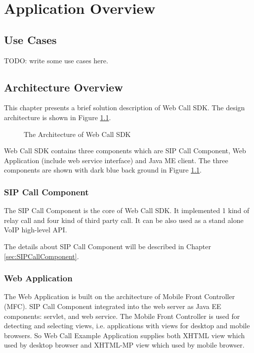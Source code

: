 
\chapter{Application Overview}
\label{sec:WebCallSDKArchitecture}

\section{Use Cases}

TODO: write some use cases here.


\section{Architecture Overview}
\label{sec:WebCallSDKArchitecture:ArchitectureOverview}

This chapter presents a brief solution description of Web Call SDK. The design architecture is shown in Figure \ref{fig:ArchitectureOfWebCallSDK}.

\begin{figure}[!hbtp]
\centering
{}
\caption{The Architecture of Web Call SDK}
\label{fig:ArchitectureOfWebCallSDK}
\end{figure}

Web Call SDK contains three components which are SIP Call Component, Web Application (include web service interface) and Java ME client. The three components are shown with dark blue back ground in Figure \ref{fig:ArchitectureOfWebCallSDK}.

\subsection{SIP Call Component}

The SIP Call Component is the core of Web Call SDK. It implemented 1 kind of relay call and four kind of third party call. It can be also used as a stand alone VoIP high-level API. 

The details about SIP Call Component will be described in Chapter \ref{sec:SIPCallComponent}.

\subsection{Web Application}

The Web Application is built on the architecture of Mobile Front Controller (MFC). SIP Call Component integrated into the web server as Java EE components: servlet, and web service. The Mobile Front Controller is used for detecting and selecting views, i.e. applications with views for desktop and mobile browsers. So Web Call Example Application supplies both XHTML view which used by desktop browser and XHTML-MP view which used by mobile browser. 

